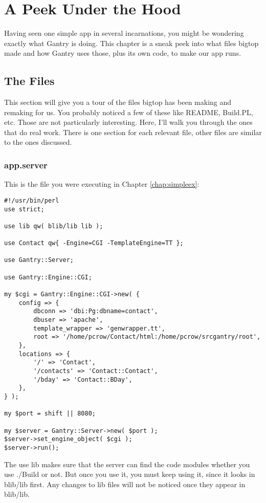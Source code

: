 \chapter{A Peek Under the Hood}
\label{chap:gantrytour}

Having seen one simple app in several incarnations, you might be wondering
exactly what Gantry is doing.  This chapter is a sneak peek into what files
bigtop made and how Gantry uses those, plus its own code, to make our app
runs.

\section{The Files}

This section will give you a tour of the files bigtop has been making and
remaking for us.  You probably noticed a few of these like README, Build.PL,
etc.  Those are not particularly interesting.  Here, I'll walk you through
the ones that do real work.  There is one section for each relevant file,
other files are similar to the ones discussed.

\subsection*{app.server}

This is the file you were executing in Chapter \ref{chap:simpleex}:

\begin{verbatim}
#!/usr/bin/perl
use strict;

use lib qw( blib/lib lib );

use Contact qw{ -Engine=CGI -TemplateEngine=TT };

use Gantry::Server;

use Gantry::Engine::CGI;

my $cgi = Gantry::Engine::CGI->new( {
    config => {
        dbconn => 'dbi:Pg:dbname=contact',
        dbuser => 'apache',
        template_wrapper => 'genwrapper.tt',
        root => '/home/pcrow/Contact/html:/home/pcrow/srcgantry/root',
    },
    locations => {
        '/' => 'Contact',
        '/contacts' => 'Contact::Contact',
        '/bday' => 'Contact::BDay',
    },
} );

my $port = shift || 8080;

my $server = Gantry::Server->new( $port );
$server->set_engine_object( $cgi );
$server->run();
\end{verbatim}

The use lib makes sure that the server can find the code modules whether
you use ./Build or not.  But once you use it, you must keep using it, since
it looks in blib/lib first.  Any changes to lib files will not be noticed
once they appear in blib/lib.

